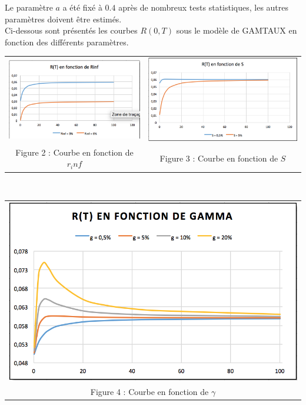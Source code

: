 \documentclass[a4paper,12pt]{article}
\begin{document}
Le paramètre $a$ a été fixé à $0.4$ après de nombreux tests statistiques, les autres paramètres doivent être estimés. \\
Ci-dessous sont présentés les courbes $R(0,T)$ sous le modèle de {\sf GAMTAUX} en fonction des différents paramètres. \\[2mm]
\begin{center}
\begin{tabular}{cc}
\includegraphics[scale=0.7]{Rrinf} & \includegraphics[scale=0.64]{Rs} \\
Figure 2 : Courbe en fonction de $r_inf$ & Figure 3 : Courbe en fonction de $S$ 
\end{tabular} \vspace*{5mm} \\
\begin{tabular}{c}
\includegraphics[scale=0.7]{Rgamma} \\
Figure 4 : Courbe en fonction de $\gamma$
\end{tabular}
\end{center}
\newpage
\end{document}
